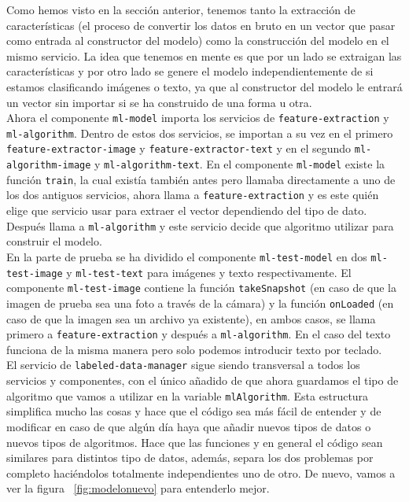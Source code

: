 \documentclass[a4paper, 12pt]{book}
\begin{document}
Como hemos visto en la sección anterior, tenemos tanto la extracción de características (el proceso de convertir los datos en bruto en un vector que pasar como entrada al constructor del modelo) como la construcción del modelo en el mismo servicio. La idea que tenemos en mente es que por un lado se extraigan las características y por otro lado se genere el modelo independientemente de si estamos clasificando imágenes o texto, ya que al constructor del modelo le entrará un vector sin importar si se ha construido de una forma u otra.\\
Ahora el componente \texttt{ml-model} importa los servicios de \texttt{feature-extraction} y \texttt{ml-algorithm}. Dentro de estos dos servicios, se importan a su vez en el primero \texttt{feature-extractor-image} y \texttt{feature-extractor-text} y en el segundo \texttt{ml-algorithm-image} y \texttt{ml-algorithm-text}.
En el componente \texttt{ml-model} existe la función \texttt{train}, la cual existía también antes pero llamaba directamente a uno de los dos antiguos servicios, ahora llama a \texttt{feature-extraction} y es este quién elige que servicio usar para extraer el vector dependiendo del tipo de dato. Después llama a \texttt{ml-algorithm} y este servicio decide que algoritmo utilizar para construir el modelo.\\
En la parte de prueba se ha dividido el componente \texttt{ml-test-model} en dos \texttt{ml-test-image} y \texttt{ml-test-text} para imágenes y texto respectivamente. El componente \texttt{ml-test-image} contiene la función \texttt{takeSnapshot} (en caso de que la imagen de prueba sea una foto a través de la cámara) y la función \texttt{onLoaded} (en caso de que la imagen sea un archivo ya existente), en ambos casos, se llama primero a \texttt{feature-extraction} y después a \texttt{ml-algorithm}. En el caso del texto funciona de la misma manera pero solo podemos introducir texto por teclado.\\
El servicio de \texttt{labeled-data-manager} sigue siendo transversal a todos los servicios y componentes, con el único añadido de que ahora guardamos el tipo de algoritmo que vamos a utilizar en la variable \texttt{mlAlgorithm}.
Esta estructura simplifica mucho las cosas y hace que el código sea más fácil de entender y de modificar en caso de que algún día haya que añadir nuevos tipos de datos o nuevos tipos de algoritmos. Hace que las funciones y en general el código sean similares para distintos tipo de datos, además, separa los dos problemas por completo haciéndolos totalmente independientes uno de otro. De nuevo, vamos a ver la figura ~\ref{fig:modelonuevo} para entenderlo mejor.
\end{document}
